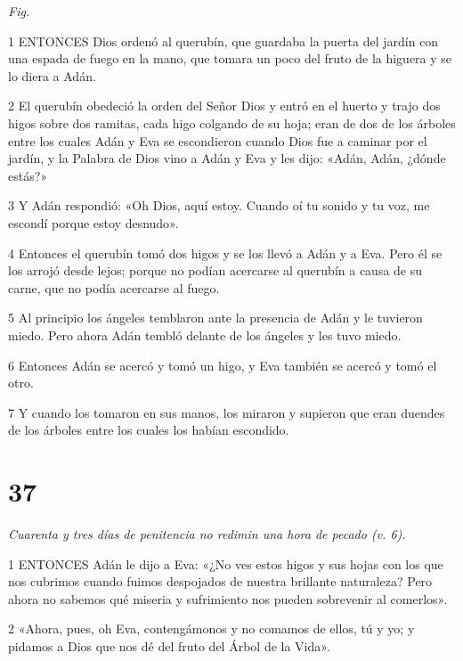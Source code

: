 \par \textit{Fig.}

\par 1 ENTONCES Dios ordenó al querubín, que guardaba la puerta del jardín con una espada de fuego en la mano, que tomara un poco del fruto de la higuera y se lo diera a Adán.

\par 2 El querubín obedeció la orden del Señor Dios y entró en el huerto y trajo dos higos sobre dos ramitas, cada higo colgando de su hoja; eran de dos de los árboles entre los cuales Adán y Eva se escondieron cuando Dios fue a caminar por el jardín, y la Palabra de Dios vino a Adán y Eva y les dijo: «Adán, Adán, ¿dónde estás?»

\par 3 Y Adán respondió: «Oh Dios, aquí estoy. Cuando oí tu sonido y tu voz, me escondí porque estoy desnudo».

\par 4 Entonces el querubín tomó dos higos y se los llevó a Adán y a Eva. Pero él se los arrojó desde lejos; porque no podían acercarse al querubín a causa de su carne, que no podía acercarse al fuego.

\par 5 Al principio los ángeles temblaron ante la presencia de Adán y le tuvieron miedo. Pero ahora Adán tembló delante de los ángeles y les tuvo miedo.

\par 6 Entonces Adán se acercó y tomó un higo, y Eva también se acercó y tomó el otro.

\par 7 Y cuando los tomaron en sus manos, los miraron y supieron que eran duendes de los árboles entre los cuales los habían escondido.

\chapter{37}

\par \textit{Cuarenta y tres días de penitencia no redimin una hora de pecado (v. 6).}

\par 1 ENTONCES Adán le dijo a Eva: «¿No ves estos higos y sus hojas con los que nos cubrimos cuando fuimos despojados de nuestra brillante naturaleza? Pero ahora no sabemos qué miseria y sufrimiento nos pueden sobrevenir al comerlos».

\par 2 «Ahora, pues, oh Eva, contengámonos y no comamos de ellos, tú y yo; y pidamos a Dios que nos dé del fruto del Árbol de la Vida».

